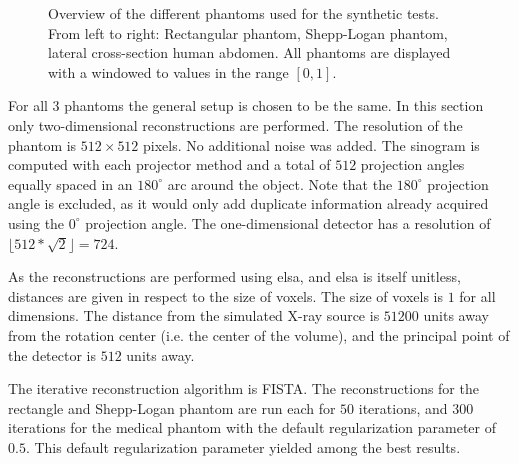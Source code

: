 \begin{figure}
	\centering
	\caption{Overview of the different phantoms used for the synthetic tests. From left to
		right: Rectangular phantom, Shepp-Logan phantom, lateral cross-section human
		abdomen. All phantoms are displayed with a windowed to values in the range
		\([0,1]\).
	}\label{fig:experiment_overview_phantoms}
\end{figure}

For all 3 phantoms the general setup is chosen to be the same. In this section only two-dimensional
reconstructions are performed. The resolution of the phantom is \(512 \times 512\) pixels. No
additional noise was added. The sinogram is computed with each projector method and a total of
\(512\) projection angles equally spaced in an \(180^\circ\) arc around the object. Note that the
\(180^\circ\) projection angle is excluded, as it would only add duplicate information already
acquired using the \(0^\circ\) projection angle. The one-dimensional detector has a resolution of
\(\lfloor 512 * \sqrt{2} \rfloor = 724\).

As the reconstructions are performed using elsa, and elsa is itself unitless, distances are given in
respect to the size of voxels.   The size of voxels is \(1\) for all dimensions. The distance from
the simulated X-ray source is \(51200\) units away from the rotation center (i.e. the center of the
volume), and the principal point of the detector is \(512\) units away.

The iterative reconstruction algorithm is \gls{FISTA}. The reconstructions for the rectangle and
Shepp-Logan phantom are run each for \(50\) iterations, and \(300\) iterations for the medical
phantom with the default regularization parameter of \(0.5\). This default regularization parameter
yielded among the best results.

